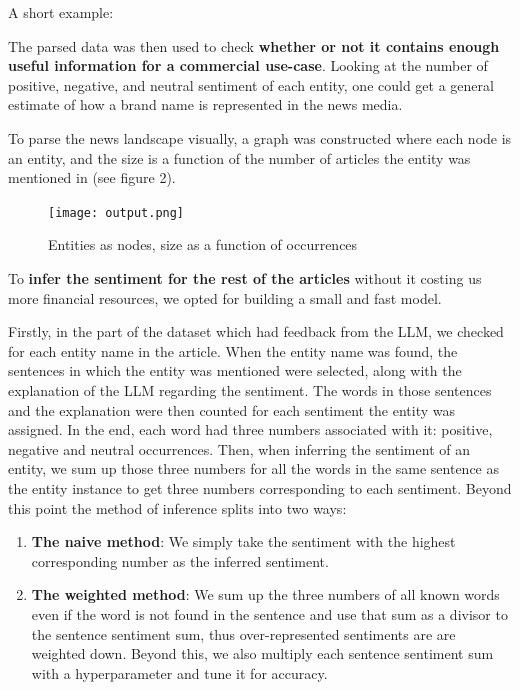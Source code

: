 \documentclass{IEEEtran}
\begin{document}
A short example:


The parsed data was then used to check \textbf{whether or not it contains enough useful information for a commercial use-case}. Looking at the number of positive, negative, and neutral sentiment of each entity, one could get a general estimate of how a brand name is represented in the news media.

To parse the news landscape visually, a graph was constructed where each node is an entity, and the size is a function of the number of articles the entity was mentioned in (see figure 2).

\begin{figure}
    \centering
    \texttt{[image: output.png]}
    \caption{Entities as nodes, size as a function of occurrences}
    \label{fig:graph}
\end{figure}


To \textbf{infer the sentiment for the rest of the articles} without it costing us more financial resources, we opted for building a small and fast model. 

Firstly, in the part of the dataset which had feedback from the LLM, we checked for each entity name in the article. When the entity name was found, the sentences in which the entity was mentioned were selected, along with the explanation of the LLM regarding the sentiment. The words in those sentences and the explanation were then counted for each sentiment the entity was assigned. In the end, each word had three numbers associated with it: positive, negative and neutral occurrences. 
Then, when inferring the sentiment of an entity, we sum up those three numbers for all the words in the same sentence as the entity instance to get three numbers corresponding to each sentiment.
Beyond this point the method of inference splits into two ways:
\begin{enumerate}
    \item \textbf{The naive method}: We simply take the sentiment with the highest corresponding number as the inferred sentiment.
    \item \textbf{The weighted method}: We sum up the three numbers of all known words even if the word is not found in the sentence and use that sum as a divisor to the sentence sentiment sum, thus over-represented sentiments are are weighted down. Beyond this, we also multiply each sentence sentiment sum with a hyperparameter and tune it for accuracy.   
\end{enumerate}
\end{document}
